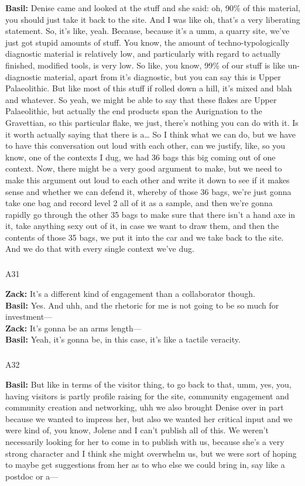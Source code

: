 \documentclass[
  canadian,
]{article}
\makeatletter
\let\oldsubparagraph\subparagraph
\renewcommand{\subparagraph}{
    \@ifstar
      \xxxSubParagraphStar
      \xxxSubParagraphNoStar
  }
\newcommand{\xxxSubParagraphStar}[1]{\oldsubparagraph*{#1}\mbox{}}
\newcommand{\xxxSubParagraphNoStar}[1]{\oldsubparagraph{#1}\mbox{}}
\makeatother
\begin{document}
\textbf{Basil:} Denise came and looked at the stuff and she said: oh,
90\% of this material, you should just take it back to the site. And I
was like oh, that's a very liberating statement. So, it's like, yeah.
Because, because it's a umm, a quarry site, we've just got stupid
amounts of stuff. You know, the amount of techno-typologically
diagnostic material is relatively low, and particularly with regard to
actually finished, modified tools, is very low. So like, you know, 99\%
of our stuff is like un-diagnostic material, apart from it's diagnostic,
but you can say this is Upper Palaeolithic. But like most of this stuff
if rolled down a hill, it's mixed and blah and whatever. So yeah, we
might be able to say that these flakes are Upper Palaeolithic, but
actually the end products span the Aurignation to the Gravettian, so
this particular flake, we just, there's nothing you can do with it. Is
it worth actually saying that there is a\ldots{} So I think what we can
do, but we have to have this conversation out loud with each other, can
we justify, like, so you know, one of the contexts I dug, we had 36 bags
this big coming out of one context. Now, there might be a very good
argument to make, but we need to make this argument out loud to each
other and write it down to see if it makes sense and whether we can
defend it, whereby of those 36 bags, we're just gonna take one bag and
record level 2 all of it as a sample, and then we're gonna rapidly go
through the other 35 bags to make sure that there isn't a hand axe in
it, take anything sexy out of it, in case we want to draw them, and then
the contents of those 35 bags, we put it into the car and we take back
to the site. And we do that with every single context we've dug.

\subparagraph{A31}\label{sec-A31}

\textbf{Zack:} It's a different kind of engagement than a collaborator
though.\\
\textbf{Basil:} Yes. And uhh, and the rhetoric for me is not going to be
so much for investment---\\
\textbf{Zack:} It's gonna be an arms length---\\
\textbf{Basil:} Yeah, it's gonna be, in this case, it's like a tactile
veracity.

\subparagraph{A32}\label{sec-A32}

\textbf{Basil:} But like in terms of the visitor thing, to go back to
that, umm, yes, you, having visitors is partly profile raising for the
site, community engagement and community creation and networking, uhh we
also brought Denise over in part because we wanted to impress her, but
also we wanted her critical input and we were kind of, you know, Jolene
and I can't publish all of this. We weren't necessarily looking for her
to come in to publish with us, because she's a very strong character and
I think she might overwhelm us, but we were sort of hoping to maybe get
suggestions from her as to who else we could bring in, say like a
postdoc or a---
\end{document}
